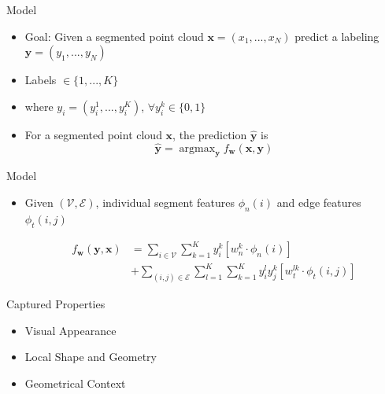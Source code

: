 \documentclass{beamer}
\DeclareMathOperator*{\argmax}{argmax}
\newcommand{\x}{{\mathbf x}}     %
\newcommand{\xs}[1]{{x_{#1}}}    %
\newcommand{\y}{{\mathbf y}}     %
\newcommand{\ys}[1]{{y_{#1}}}    %
\newcommand{\ysc}[2]{{y_{#1}^{#2}}}    %
\newcommand{\fn}[1]{{\phi_n(#1)}}      %
\newcommand{\fe}[3]{{\phi_{#1}(#2,#3)}}%
\newcommand{\w}{{\mathbf w}}           %
\newcommand{\wn}[1]{{w_n^{#1}}}        %
\newcommand{\we}[3]{{w_{#1}^{#2#3}}}   %
\newcommand{\df}[3]{{f_{#3}(#1,#2)}}   %
\begin{document}
\begin{frame}{Model}
\begin{itemize}


\item Goal: Given a segmented point cloud $\x=(\xs{1},...,\xs{N})$  predict a labeling $\y=(\ys{1},...,\ys{N})$
\item Labels $\in  \{ 1, ..., K \} $
\item where $\ys{i}=(\ysc{i}{1},...,\ysc{i}{K})$,  $ \forall \ysc{i}{k} \in \{0,1\}$ 


\item For a segmented point cloud $\x$, the prediction $\hat{\y}$ is 
\begin{equation} \label{eq:argmax}
\hat{\y} = \argmax_\y \df{\x}{\y}{\w}
\end{equation}

\end{itemize}
\end{frame}


\begin{frame}{Model}
\begin{itemize}

\item Given $(\mathcal{V},\mathcal{E})$, individual segment features $\fn{i}$ and edge features $\fe{t}{i}{j}$

\begin{equation} \label{eq:model}
\begin{split}
\df{\y}{\x}{\w} & = \sum_{i \in \mathcal{V}} \sum_{k=1}^{K} \ysc{i}{k} \left[\wn{k} \cdot \fn{i} \right] \\
 & + \sum_{(i,j)\in \mathcal{E}}   \sum_{l=1}^{K}  \sum_{k=1}^{K} \ysc{i}{l} \ysc{j}{k}  \left[\we{t}{l}{k} \cdot \fe{t}{i}{j}\right] 
 \end{split}
\end{equation}

\end{itemize}
\end{frame}

\begin{frame}{Captured Properties}
	\begin{itemize}
		\item Visual Appearance
		\item  Local Shape and Geometry
		\item  Geometrical Context
	\end{itemize}

\end{frame}
\end{document}
